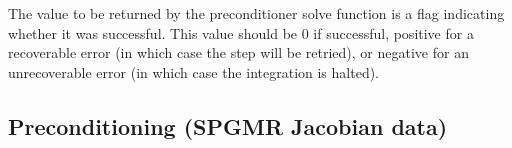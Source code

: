 {
  The value to be returned by the preconditioner solve function is a flag
  indicating whether it was successful.  This value should be $0$ if successful, 
  positive for a recoverable error (in which case the step will be retried), or
  negative for an unrecoverable error (in which case the integration is halted). 
}
{}

\subsection{Preconditioning (SPGMR Jacobian data)}\label{ss:precondFn}


